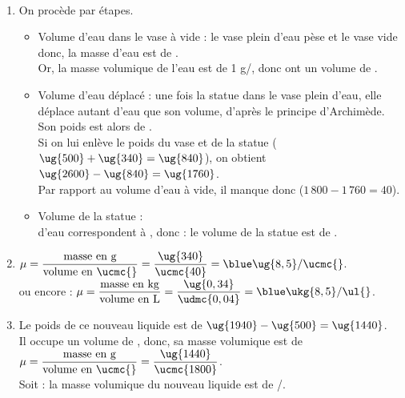 \begin{corrige} 
\ \\ [-5mm]
   \begin{enumerate}
      \item On procède par étapes.
         \begin{itemize}
            \item Volume d'eau dans le vase à vide : le vase plein d'eau pèse  et le vase vide  donc, la masse d'eau est de . \\
            Or, la masse volumique de l'eau est de 1 g/\ucmc{}, donc  ont un volume de .
            \item Volume d'eau déplacé : une fois la statue dans le vase plein d'eau, elle déplace autant d'eau que son volume, d'après le principe d'Archimède. Son poids est alors de . \\
            Si on lui enlève le poids du vase et de la statue ($\ug{500}+ \ug{340} =\ug{840}$), on obtient $\ug{2600}-\ug{840} =\ug{1760}$. \\
            Par rapport au volume d'eau à vide, il manque donc  ($1\,800-1\,760 = 40$).
            \item Volume de la statue : \\
                d'eau correspondent à , donc : {\blue le volume de la statue est de }.
         \end{itemize}
         \medskip
         \item $\mu=\dfrac{\text{masse en g}}{\text{volume en \ucmc{}}} =\dfrac{\ug{340}}{\ucmc{40}} ={\blue\ug{8,5}\slash \ucmc{}}$. \\ [1mm]
            ou encore : $\mu=\dfrac{\text{masse en kg}}{\text{volume en L}} =\dfrac{\ug{0,34}}{\udmc{0,04}} ={\blue \ukg{8,5}\slash\ul{}}$. \\
         \medskip
         \item Le poids de ce nouveau liquide est de $\ug{1940}-\ug{500} =\ug{1440}$. \\
            Il occupe un volume de , donc, sa masse volumique est de $\mu=\dfrac{\text{masse en g}}{\text{volume en \ucmc{}}} =\dfrac{\ug{1440}}{\ucmc{1800}}$. \\
             Soit : {\blue la masse volumique du nouveau liquide est de \slash\ucmc{}.}
   \end{enumerate}
\end{corrige} 

\bigskip


